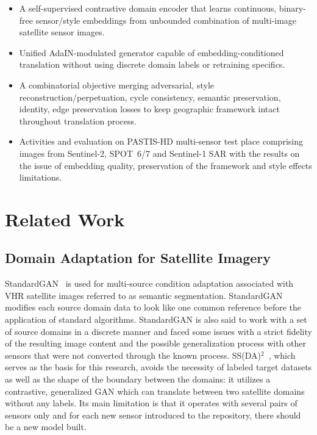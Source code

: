 \documentclass[runningheads]{llncs}
\begin{document}
\begin{itemize}
\item A self-supervised contrastive domain encoder that learns continuous, binary-free sensor/style embeddings from unbounded combination of multi-image satellite sensor images.
\item Unified AdaIN-modulated generator capable of embedding-conditioned translation without using discrete domain labels or retraining specifics.
\item A combinatorial objective merging adversarial, style reconstruction/perpetuation, cycle consistency, semantic preservation, identity, edge preservation losses to keep geographic framework intact throughout translation process.
\item Activities and evaluation on PASTIS-HD multi-sensor test place comprising images from Sentinel-2, SPOT~6/7 and Sentinel-1 SAR with the results on the issue of embedding quality, preservation of the framework and style effects limitations.
\end{itemize}

\section{Related Work}

\subsection{Domain Adaptation for Satellite Imagery}
StandardGAN~\cite{tasar2020standardgan} is used for multi-source condition adaptation associated with VHR satellite images referred to as semantic segmentation. StandardGAN modifies each source domain data to look like one common reference before the application of standard algorithms. StandardGAN is also said to work with a set of source domains in a discrete manner and faced some issues with a strict fidelity of the resulting image content and the possible generalization process with other sensors that were not converted through the known process. SS(DA)$^2$~\cite{zhang2023ssdada}, which serves as the basis for this research, avoids the necessity of labeled target datasets as well as the shape of the boundary between the domains: it utilizes a contrastive, generalized GAN which can translate between two satellite domains without any labels. Its main limitation is that it operates with several pairs of sensors only and for each new sensor introduced to the repository, there should be a new model built.
\end{document}
